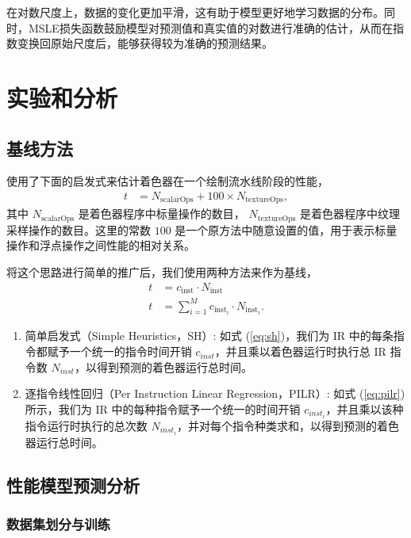在对数尺度上，数据的变化更加平滑，这有助于模型更好地学习数据的分布。同时，MSLE损失函数鼓励模型对预测值和真实值的对数进行准确的估计，从而在指数变换回原始尺度后，能够获得较为准确的预测结果。

\section{实验和分析}

\subsection{基线方法}

\citet{10.1145/2816795.2818104} 使用了下面的启发式来估计着色器在一个绘制流水线阶段的性能，
\begin{align}
t &= N_\text{scalarOps} + 100 \times N_\text{textureOps},
\end{align}
其中 $N_\text{scalarOps}$ 是着色器程序中标量操作的数目， $N_\text{textureOps}$ 是着色器程序中纹理采样操作的数目。这里的常数 $100$ 是一个原方法中随意设置的值，用于表示标量操作和浮点操作之间性能的相对关系。

将这个思路进行简单的推广后，我们使用两种方法来作为基线，
\begin{align}
\label{eq:sh} t &= c_\text{inst} \cdot N_\text{inst} \\
\label{eq:pilr} t &= \sum_{i=1}^{M} c_{\text{inst}_{i}} \cdot N_{\text{inst}_{i}}.
\end{align}

\begin{enumerate}
    \item 简单启发式（Simple Heuristics，SH）: 如式 (\ref{eq:sh})，我们为 IR 中的每条指令都赋予一个统一的指令时间开销 $c_{inst}$，并且乘以着色器运行时执行总 IR 指令数 $N_{inst}$，以得到预测的着色器运行总时间。
    \item 逐指令线性回归（Per Instruction Linear Regression，PILR）: 如式 (\ref{eq:pilr}) 所示，我们为 IR 中的每种指令赋予一个统一的时间开销 $c_{inst_i}$，并且乘以该种指令运行时执行的总次数 $N_{inst_i}$，并对每个指令种类求和，以得到预测的着色器运行总时间。
\end{enumerate}



\subsection{性能模型预测分析}

\subsubsection{数据集划分与训练}

